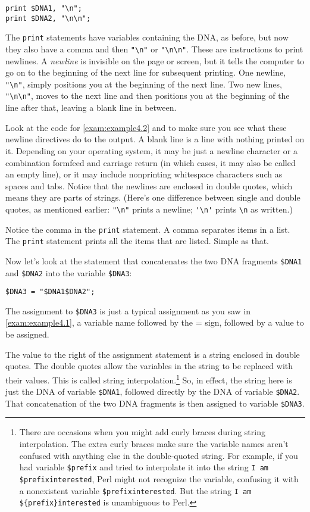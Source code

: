 \begin{lstlisting}
print $DNA1, "\n";
print $DNA2, "\n\n";
\end{lstlisting}

The \verb|print| statements have variables containing the DNA, as before, but now they also have a comma and then \verb|"\n"| or \verb|"\n\n"|. These are instructions to print newlines. A \textit{newline} is invisible on the page or screen, but it tells the computer to go on to the beginning of the next line for subsequent printing. One newline, \verb|"\n"|, simply positions you at the beginning of the next line. Two new lines, \verb|"\n\n"|, moves to the next line and then positions you at the beginning of the line after that, leaving a blank line in between.  

Look at the code for \autoref{exam:example4.2} and to make sure you see what these newline directives do to the output. A blank line is a line with nothing printed on it. Depending on your operating system, it may be just a newline character or a combination formfeed and carriage return (in which cases, it may also be called an empty line), or it may include nonprinting whitespace characters such as spaces and tabs. Notice that the newlines are enclosed in double quotes, which means they are parts of strings. (Here's one difference between single and double quotes, as mentioned earlier: \verb|"\n"| prints a newline; \verb|'\n'| prints \verb|\n| as written.)

Notice the comma in the \verb|print| statement. A comma separates items in a list. The \verb|print| statement prints all the items that are listed. Simple as that.

Now let's look at the statement that concatenates the two DNA fragments \verb|$DNA1| and \verb|$DNA2| into the variable \verb|$DNA3|:

\begin{lstlisting}
$DNA3 = "$DNA1$DNA2"; 
\end{lstlisting}

The assignment to \verb|$DNA3| is just a typical assignment as you saw in \autoref{exam:example4.1}, a variable name followed by the = sign, followed by a value to be assigned.

The value to the right of the assignment statement is a string enclosed in double quotes. The double quotes allow the variables in the string to be replaced with their values. This is called string interpolation.\footnote{There are occasions when you might add curly braces during string interpolation. The extra curly braces make sure the variable names aren't confused with anything else in the double-quoted string. For example, if you had variable \verb|$prefix| and tried to interpolate it into the string \verb|I am $prefixinterested|, Perl might not recognize the variable, confusing it with a nonexistent variable \verb|$prefixinterested|. But the string \verb|I am ${prefix}interested| is unambiguous to Perl.} So, in effect, the string here is just the DNA of variable \verb|$DNA1|, followed directly by the DNA of variable \verb|$DNA2|. That concatenation of the two DNA fragments is then assigned to variable \verb|$DNA3|.

